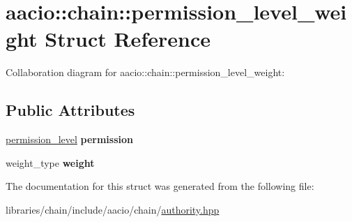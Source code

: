 \hypertarget{structaacio_1_1chain_1_1permission__level__weight}{}\section{aacio\+:\+:chain\+:\+:permission\+\_\+level\+\_\+weight Struct Reference}
\label{structaacio_1_1chain_1_1permission__level__weight}


Collaboration diagram for aacio\+:\+:chain\+:\+:permission\+\_\+level\+\_\+weight\+:
\subsection*{Public Attributes}
\begin{DoxyCompactItemize}
\item 
\mbox{\label{structaacio_1_1chain_1_1permission__level__weight_a7be3d5a298bc28d96fe689a611560bf5}} 
\mbox{\hyperlink{structaacio_1_1chain_1_1permission__level}{permission\+\_\+level}} {\bfseries permission}
\item 
\mbox{\label{structaacio_1_1chain_1_1permission__level__weight_ab02ea5c3289015ed9fdb11f8015d9896}} 
weight\+\_\+type {\bfseries weight}
\end{DoxyCompactItemize}


The documentation for this struct was generated from the following file\+:\begin{DoxyCompactItemize}
\item 
libraries/chain/include/aacio/chain/\mbox{\hyperlink{authority_8hpp}{authority.\+hpp}}\end{DoxyCompactItemize}
